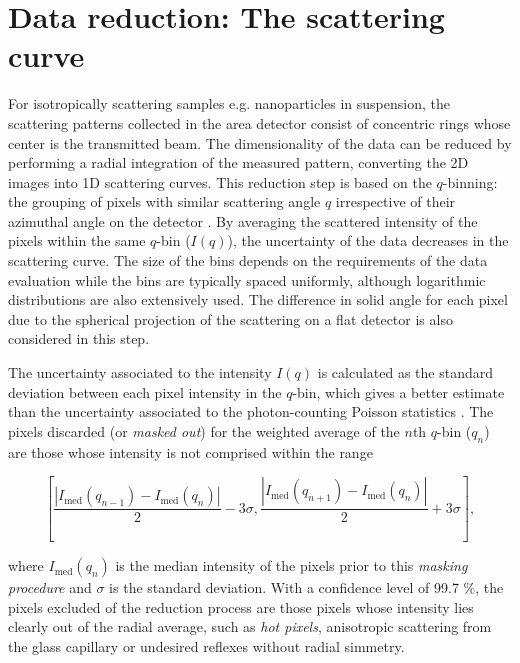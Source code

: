 \section{Data reduction: The scattering curve}
\label{sec:data_reduction}

For isotropically scattering samples e.g. nanoparticles in suspension, the scattering patterns collected in the area detector consist of concentric rings whose center is the transmitted beam. The dimensionality of the data can be reduced by performing a radial integration of the measured pattern, converting the 2D images into 1D scattering curves. This reduction step is based on the $q$-binning: the grouping of pixels with similar scattering angle $q$ irrespective of their azimuthal angle on the detector \citep{pauw_everything_2013}. By averaging the scattered intensity of the pixels within the same $q$-bin ($I(q)$), the uncertainty of the data decreases in the scattering curve. The size of the bins depends on the requirements of the data evaluation while the bins are typically spaced uniformly, although logarithmic distributions are also extensively used. The difference in solid angle for each pixel due to the spherical projection of the scattering on a flat detector is also considered in this step.

The uncertainty associated to the intensity $I(q)$ is calculated as the standard deviation between each pixel intensity in the $q$-bin, which gives a better estimate than the uncertainty associated to the photon-counting Poisson statistics \citep{pauw_everything_2013}. The pixels discarded (or \emph{masked out}) for the weighted average of the $n$th $q$-bin ($q_n$) are those whose intensity is not comprised within the range 

\begin{equation}
\left[ \frac{\left|I_{\text{med}}\left( q_{n-1}\right)-I_{\text{med}}\left( q_{n}\right)\right|}{2} - 3 \sigma , \frac{\left|I_{\text{med}}\left( q_{n+1}\right)-I_{\text{med}}\left( q_{n}\right)\right|}{2} + 3 \sigma \right], 
\end{equation}

where $I_{\text{med}}\left( q_{n}\right)$ is the median intensity of the pixels prior to this \emph{masking procedure} and $\sigma$ is the standard deviation. With a confidence level of 99.7 $\%$, the pixels excluded of the reduction process are those pixels whose intensity lies clearly out of the radial average, such as \emph{hot pixels}, anisotropic scattering from the glass capillary or undesired reflexes without radial simmetry.

